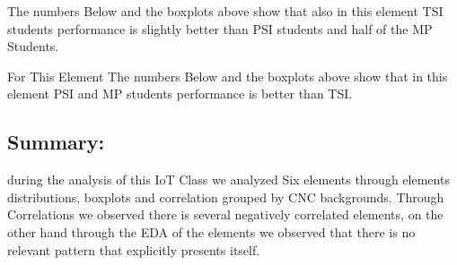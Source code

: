 \documentclass[12pt]{extreport}
\begin{document}
The numbers Below and the boxplots above show that also in this element  TSI students performance is slightly better than PSI students and half of the MP Students.

For This Element The numbers Below and the boxplots above show that in this element  PSI and MP students performance is  better than TSI.

\begin{comment}


\begin{enumerate}	
	\item The MP Class Box-Plot:
	\begin{enumerate}
		\item MAX = a {} {} {} {} {} {} {} {} UQ = b {} {} {} {} {} {} {} {} Median = c
		\item LQ = d {} {} {} {} {} {} {} {}  MIN =	l {} {} {} {} {} {} {} {}  IQR = e - f = g
	\end{enumerate}
	\item The PSI Class Box-Plot:
	\begin{enumerate}
		\item MAX = a {} {} {} {} {} {} {} {} UQ = b {} {} {} {} {} {} {} {} Median = c
		\item LQ = d {} {} {} {} {} {} {} {}  MIN =	e {} {} {} {} {} {} {} {} IQR = f - g = h	
	\end{enumerate}
	\item The TSI Class Box-Plot:
	\begin{enumerate}
		\item MAX = a {} {} {} {} {} {} {} {} UQ = b {} {} {} {} {} {} {} {} Median = c
		\item LQ = d {} {} {} {} {} {} {} {} MIN = e {} {} {} {} {} {} {} {} IQR = f - g = h	
	\end{enumerate}
\end{enumerate}
\end{comment}




\subsection{Summary:}
during the analysis of this IoT Class we analyzed Six elements through elements distributions, boxplots and correlation grouped by CNC backgrounds. Through Correlations we observed there is several negatively correlated elements, on the other hand through the EDA of the elements we observed that there is no relevant pattern that explicitly presents itself.
\end{document}
